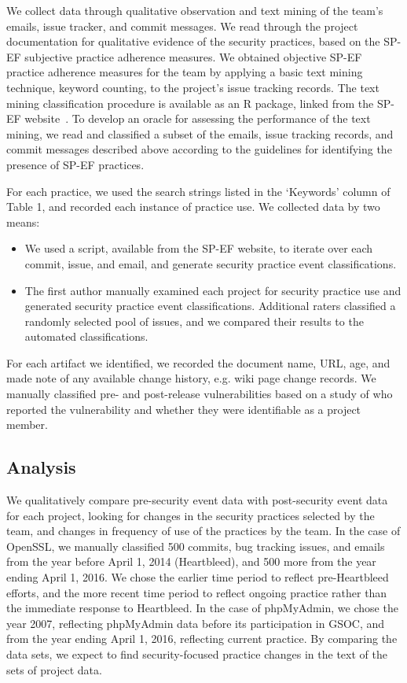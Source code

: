 We collect data through qualitative observation and text mining of the team's emails, issue tracker, and commit messages. We read through the project documentation for qualitative evidence of the security practices, based on the SP-EF subjective practice adherence measures. We obtained objective SP-EF practice adherence measures for the team by applying a basic text mining technique, keyword counting, to the project's issue tracking records. The text mining classification procedure is available as an R package, linked from the SP-EF website~\cite{morrison2016spef}.   To develop an oracle for assessing the performance of the text mining, we read and classified a subset of the emails, issue tracking records, and commit messages described above according to the guidelines for identifying the presence of SP-EF practices. 

For each practice, we used the search strings listed in the ‘Keywords’ column of Table 1, and recorded each instance of practice use.  We collected data by two means:
\begin{itemize}
	\item We used a script, available from the SP-EF website, to iterate over each commit, issue, and email, and generate security practice event classifications.
	\item The first author manually examined each project for security practice use and generated security practice event classifications. Additional raters classified a randomly selected pool of issues, and we compared their results to the automated classifications.
\end{itemize}

For each artifact we identified, we recorded the document name, URL, age, and made note of any available change history, e.g. wiki page change records. We manually classified pre- and post-release vulnerabilities based on a study of who reported the vulnerability and whether they were identifiable as a project member.

\subsection{Analysis}

We qualitatively compare pre-security event data with post-security event data for each project, looking for changes in the security practices selected by the team, and changes in frequency of use of the practices by the team. In the case of OpenSSL, we manually classified 500 commits, bug tracking issues, and emails from the year before April 1, 2014 (Heartbleed), and 500 more from the year ending April 1, 2016.  We chose the earlier time period to reflect pre-Heartbleed efforts, and the more recent time period to reflect ongoing practice rather than the immediate response to Heartbleed. In the case of phpMyAdmin, we chose the year 2007, reflecting phpMyAdmin data before its participation in GSOC, and from the year ending April 1, 2016, reflecting current practice. By comparing the data sets, we expect to find security-focused practice changes in the text of the sets of project data.

